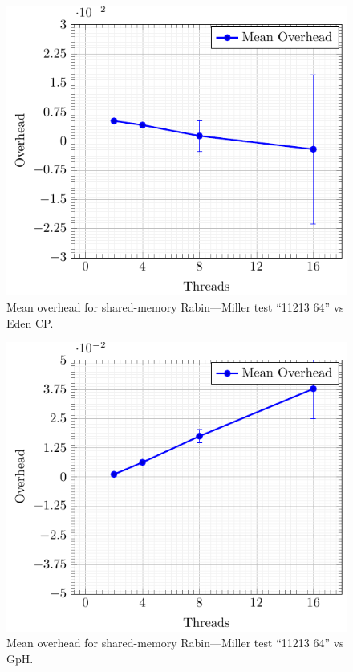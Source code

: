 \documentclass[paper=A4,twoside=true,openright,parskip=full,chapterprefix=true,headings=normal,bibliography=totoc,listof=totoc,titlepage=on,captions=tableabove,draft=false,british]{scrreprt}%
\renewcommand{\enquote}[1]{{``}#1{''}}
\begin{document}
\begin{figure}[h]
\centering
\includegraphics{src/img/overSMRM64Eden.pdf}
\caption{Mean overhead for shared-memory Rabin---Miller test
\enquote{11213 64} vs Eden CP.\label{fig:overSMRM64Eden}}
\end{figure}

\begin{figure}[h]
\centering
\includegraphics{src/img/overSMRM64GpH.pdf}
\caption{Mean overhead for shared-memory Rabin---Miller test
\enquote{11213 64} vs GpH.\label{fig:overSMRM64GpH}}
\end{figure}
\end{document}
